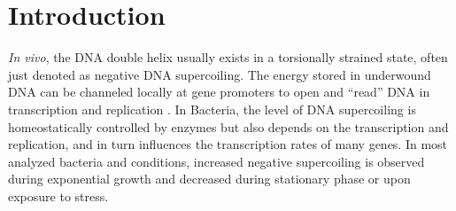 \documentclass[10pt,a4]{article}
\def\cite#1{\hypersetup{citecolor=Teal}\citep{#1}} %
\begin{document}
\section{Introduction}
\textit{In vivo}, the DNA double helix usually exists in a torsionally
strained state, often just denoted as negative DNA supercoiling.  The
energy stored in underwound DNA can be channeled locally at gene
promoters to open and ``read'' DNA in transcription and replication
\cite{Dorman2019}.  In Bacteria, the level of DNA supercoiling is
homeostatically controlled by enzymes but also depends on the
transcription and replication, and in turn influences the
transcription rates of many genes.  In most analyzed bacteria and
conditions, increased negative supercoiling is observed during
exponential growth and decreased during stationary phase or upon
exposure to stress.
%
%
\end{document}
